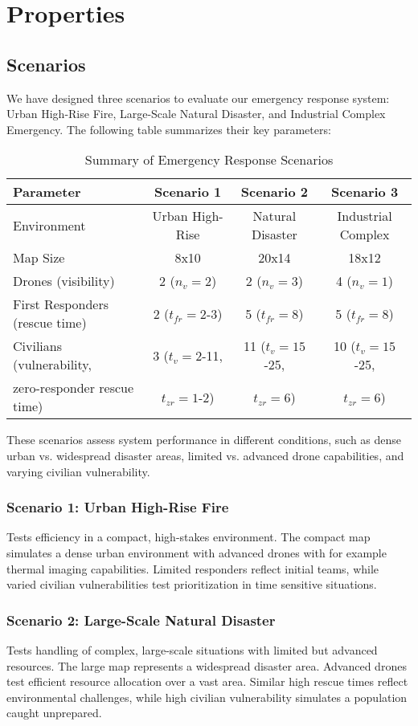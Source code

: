
\section{Properties}

\subsection{Scenarios}

We have designed three scenarios to evaluate our emergency response system: Urban High-Rise Fire, Large-Scale Natural Disaster, and Industrial Complex Emergency. The following table summarizes their key parameters:
\begin{table}[h]
	\centering
	\begin{tabular}{|l|c|c|c|}
		\hline
		\textbf{Parameter} & \textbf{Scenario 1} & \textbf{Scenario 2} & \textbf{Scenario 3} \\
		\hline
		Environment & Urban High-Rise & Natural Disaster & Industrial Complex \\
		Map Size & 8x10 & 20x14 & 18x12 \\
		Drones (visibility) & 2 ($n_v = 2$) & 2 ($n_v = 3$) & 4 ($n_v = 1$) \\
		First Responders (rescue time) & 2 ($t_{fr} = 2$-3) & 5 ($t_{fr} = 8$) & 5 ($t_{fr} = 8$) \\
		Civilians (vulnerability, & 3 ($t_v = 2$-11, & 11 ($t_v = 15$-25, & 10 ($t_v = 15$-25, \\
		zero-responder rescue time) & $t_{zr} = 1$-2) & $t_{zr} = 6$) & $t_{zr} = 6$) \\
		\hline
	\end{tabular}
	\caption{Summary of Emergency Response Scenarios}
	\label{tab:scenarios}
\end{table}

These scenarios assess system performance in different conditions, such as dense urban vs. widespread disaster areas, limited vs. advanced drone capabilities, and varying civilian vulnerability.
\subsubsection{Scenario 1: Urban High-Rise Fire}
Tests efficiency in a compact, high-stakes environment. The compact map simulates a dense urban environment with advanced drones with for example thermal imaging capabilities. Limited responders reflect initial teams, while varied civilian vulnerabilities test prioritization in time sensitive situations.
\subsubsection{Scenario 2: Large-Scale Natural Disaster}
Tests handling of complex, large-scale situations with limited but advanced resources. The large map represents a widespread disaster area. Advanced drones test efficient resource allocation over a vast area. Similar high rescue times reflect environmental challenges, while high civilian vulnerability simulates a population caught unprepared.
